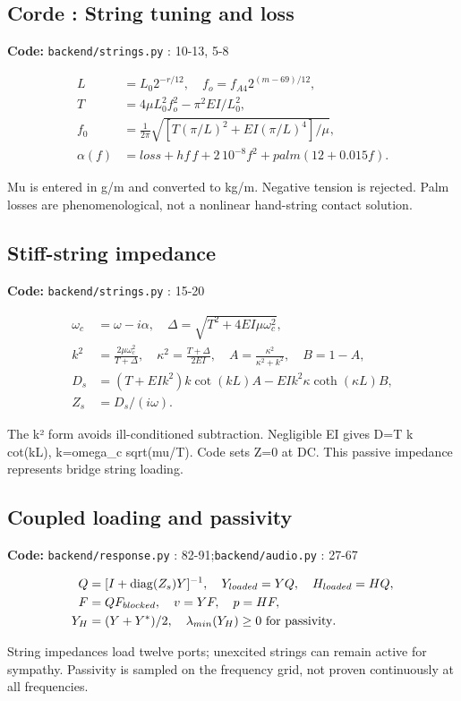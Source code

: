 \documentclass[10pt,a4paper]{article}
\newcommand{\loc}[1]{{\small\color{ink}\textbf{Code:} #1\par}}
\begin{document}
\begin{samepage}\subsection{Corde : String tuning and loss}
\loc{\texttt{backend/strings.py} : 10-13, 5-8}
\begin{align}L&=L_0 2^{-r/12},\quad f_o=f_{A4}2^{(m-69)/12},\\
T&=4\mu L_0^2f_o^2-\pi^2EI/L_0^2,\\
f_0&=\frac1{2\pi}\sqrt{[T(\pi/L)^2+EI(\pi/L)^4]/\mu},\\
\alpha(f)&=loss+hf\,f+2\,10^{-8}f^2+palm(12+0.015f).\end{align}

Mu is entered in g/m and converted to kg/m. Negative tension is rejected. Palm losses are phenomenological, not a nonlinear hand-string contact solution.\par
\end{samepage}
\begin{samepage}\subsection{Stiff-string impedance}
\loc{\texttt{backend/strings.py} : 15-20}
\begin{align}\omega_c&=\omega-i\alpha,\quad\Delta=\sqrt{T^2+4EI\mu\omega_c^2},\\
k^2&=\frac{2\mu\omega_c^2}{T+\Delta},\quad\kappa^2=\frac{T+\Delta}{2EI},\quad A=\frac{\kappa^2}{\kappa^2+k^2},\quad B=1-A,\\
D_s&=(T+EI k^2)k\cot(kL)A-EI k^2\kappa\coth(\kappa L)B,\\
Z_s&=D_s/(i\omega).\end{align}

The k² form avoids ill-conditioned subtraction. Negligible EI gives D=T k cot(kL), k=omega\_c sqrt(mu/T). Code sets Z=0 at DC. This passive impedance represents bridge string loading.\par
\end{samepage}
\begin{samepage}\subsection{Coupled loading and passivity}
\loc{\texttt{backend/response.py} : 82-91;\allowbreak\quad \texttt{backend/audio.py} : 27-67}
\begin{align}Q&=[I+\operatorname{diag}(Z_s)Y]^{-1},\quad Y_{loaded}=YQ,\quad H_{loaded}=HQ,\\
F&=QF_{blocked},\quad v=YF,\quad p=HF,\\
Y_H&=(Y+Y^*)/2,\quad\lambda_{min}(Y_H)\geq0\ \text{for passivity}.\end{align}

String impedances load twelve ports; unexcited strings can remain active for sympathy. Passivity is sampled on the frequency grid, not proven continuously at all frequencies.\par
\end{samepage}
\end{document}
